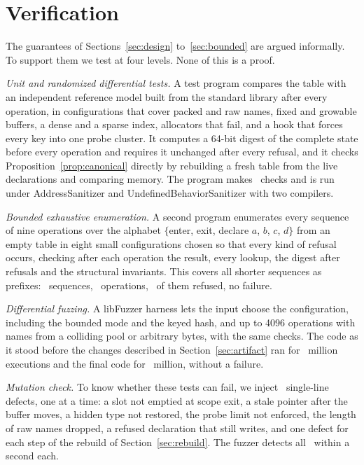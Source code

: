 \section{Verification}
\label{sec:verification}
The guarantees of Sections~\ref{sec:design} to~\ref{sec:bounded} are argued informally. To support them we test at four levels. None of this is a proof.

\emph{Unit and randomized differential tests.} A test program compares the table with an independent reference model built from the standard library after every operation, in configurations that cover packed and raw names, fixed and growable buffers, a dense and a sparse index, allocators that fail, and a hook that forces every key into one probe cluster. It computes a 64-bit digest of the complete state before every operation and requires it unchanged after every refusal, and it checks Proposition~\ref{prop:canonical} directly by rebuilding a fresh table from the live declarations and comparing memory. The program makes \UnitChecks\ checks and is run under AddressSanitizer and UndefinedBehaviorSanitizer with two compilers.

\emph{Bounded exhaustive enumeration.} A second program enumerates every sequence of nine operations over the alphabet $\{$enter, exit, declare $a$, $b$, $c$, $d\}$ from an empty table in eight small configurations chosen so that every kind of refusal occurs, checking after each operation the result, every lookup, the digest after refusals and the structural invariants. This covers all shorter sequences as prefixes: \ExhSeq\ sequences, \ExhOps\ operations, \ExhRefusals\ of them refused, no failure.

\emph{Differential fuzzing.} A libFuzzer harness lets the input choose the configuration, including the bounded mode and the keyed hash, and up to 4096 operations with names from a colliding pool or arbitrary bytes, with the same checks. The code as it stood before the changes described in Section~\ref{sec:artifact} ran for \FuzzBefore\ million executions and the final code for \FuzzFinal\ million, without a failure.

\emph{Mutation check.} To know whether these tests can fail, we inject \Mutants\ single-line defects, one at a time: a slot not emptied at scope exit, a stale pointer after the buffer moves, a hidden type not restored, the probe limit not enforced, the length of raw names dropped, a refused declaration that still writes, and one defect for each step of the rebuild of Section~\ref{sec:rebuild}. The fuzzer detects all \Mutants\ within a second each.

